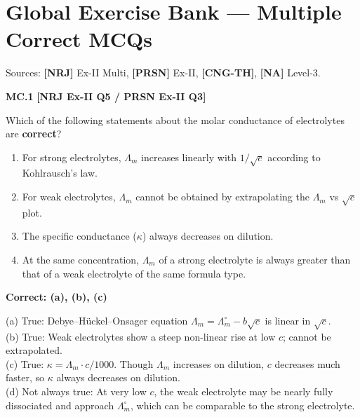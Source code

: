 \chapter*{Global Exercise Bank --- Multiple Correct MCQs}
\label{chap:multiple_correct}

\begin{tcolorbox}[enhanced,colback=subtleblue,colframe=primarynavy,arc=2mm,boxrule=1pt,
    title=\textbf{\large One or More Than One Correct Options (All Chapters)}]
Sources: \textbf{[NRJ]} Ex-II Multi, \textbf{[PRSN]} Ex-II, \textbf{[CNG-TH]}, \textbf{[NA]} Level-3.
\end{tcolorbox}

\begin{problembox}
\textbf{MC.1} \hfill \textbf{[NRJ Ex-II Q5 / PRSN Ex-II Q3]}

Which of the following statements about the molar conductance of electrolytes are \textbf{correct}?
\begin{enumerate}[label=(\alph*)]
    \item For strong electrolytes, $\Lambda_m$ increases linearly with $1/\sqrt{c}$ according to Kohlrausch's law.
    \item For weak electrolytes, $\Lambda_m$ cannot be obtained by extrapolating the $\Lambda_m$ vs $\sqrt{c}$ plot.
    \item The specific conductance ($\kappa$) always decreases on dilution.
    \item At the same concentration, $\Lambda_m$ of a strong electrolyte is always greater than that of a weak electrolyte of the same formula type.
\end{enumerate}
\end{problembox}
\begin{solution}
\textbf{Correct: (a), (b), (c)}

(a) True: Debye--H\"{u}ckel--Onsager equation $\Lambda_m = \Lambda_m^\circ - b\sqrt{c}$ is linear in $\sqrt{c}$.\\
(b) True: Weak electrolytes show a steep non-linear rise at low $c$; cannot be extrapolated.\\
(c) True: $\kappa = \Lambda_m \cdot c/1000$. Though $\Lambda_m$ increases on dilution, $c$ decreases much faster, so $\kappa$ always decreases on dilution.\\
(d) Not always true: At very low $c$, the weak electrolyte may be nearly fully dissociated and approach $\Lambda_m^\circ$, which can be comparable to the strong electrolyte.
\end{solution}

